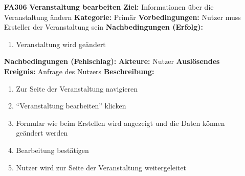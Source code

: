 \documentclass[parskip=full]{scrartcl}
\begin{document}
\begin{itemize}[nosep]
			
			\newpage
			\item[\textbf{FA306}]\textbf{Veranstaltung bearbeiten}
			\newline \textbf{Ziel:} Informationen über die Veranstaltung ändern
			\newline \textbf{Kategorie:} Primär
			\newline \textbf{Vorbedingungen:} Nutzer muss Ersteller der Veranstaltung sein
			\newline \textbf{Nachbedingungen (Erfolg):} 
			\begin{enumerate}[nosep]
				\item Veranstaltung wird geändert 
			\end{enumerate}
			\textbf{Nachbedingungen (Fehlschlag):}
			\newline \textbf{Akteure:} Nutzer
			\newline \textbf{Auslösendes Ereignis:} Anfrage des Nutzers
			\newline \textbf{Beschreibung:}
			\begin{enumerate}[nosep]
				\item Zur Seite der Veranstaltung navigieren
				\item “Veranstaltung bearbeiten” klicken
				\item  Formular wie beim Erstellen wird angezeigt und die Daten können geändert werden
				\item Bearbeitung bestätigen
				\item Nutzer wird zur Seite der Veranstaltung weitergeleitet\\
			\end{enumerate}
			
			
			
			
			

\end{itemize}
\end{document}
